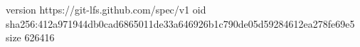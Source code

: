 version https://git-lfs.github.com/spec/v1
oid sha256:412a971944db0cad6865011de33a646926b1c790de05d59284612ea278fe69e5
size 626416
